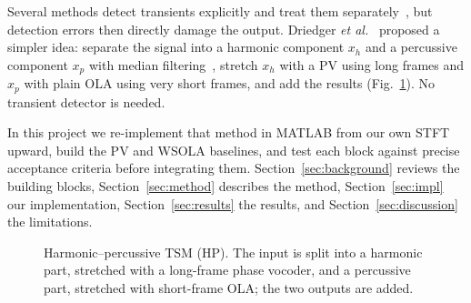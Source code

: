 \documentclass[conference]{IEEEtran}
\begin{document}
Several methods detect transients explicitly and treat them separately~\cite{nagel09}, but detection errors then directly damage the output. Driedger \emph{et al.}~\cite{driedger14} proposed a simpler idea: separate the signal into a harmonic component $x_h$ and a percussive component $x_p$ with median filtering~\cite{fitzgerald10}, stretch $x_h$ with a PV using long frames and $x_p$ with plain OLA using very short frames, and add the results (Fig.~\ref{fig:pipeline}). No transient detector is needed.

In this project we re-implement that method in MATLAB from our own STFT upward, build the PV and WSOLA baselines, and test each block against precise acceptance criteria before integrating them. Section~\ref{sec:background} reviews the building blocks, Section~\ref{sec:method} describes the method, Section~\ref{sec:impl} our implementation, Section~\ref{sec:results} the results, and Section~\ref{sec:discussion} the limitations.

\begin{figure}[t]
\centering
{}
\caption{Harmonic--percussive TSM (HP). The input is split into a harmonic part, stretched with a long-frame phase vocoder, and a percussive part, stretched with short-frame OLA; the two outputs are added.}
\label{fig:pipeline}
\end{figure}

\end{document}
